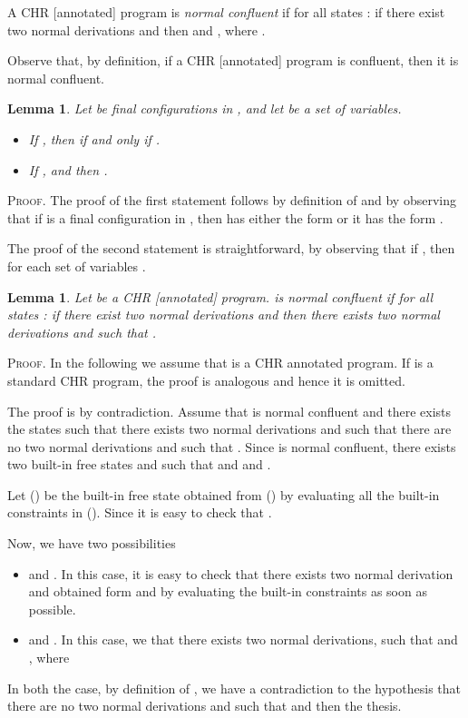 \documentclass[final]{acmtrans2e}
\newtheorem{lemma}[theorem]{Lemma}
\begin{document}
\begin{definition}
A CHR [annotated] program is \emph{normal confluent} if for all states
:
if there exist two normal derivations  and  then  and , where .
\end{definition}


Observe that, by definition, if a CHR [annotated] program is confluent, then it is normal confluent.


\begin{lemma}\label{relrel}
Let  be final configurations in ,  and let  be a set of variables.
\begin{itemize}
  \item If ,  then   if and only if .
  \item If ,  and   then .
\end{itemize}
\end{lemma}
\textsc{Proof.}
The proof of the first statement follows by definition of  and by observing that if  is a final configuration in , then 
has either the form   or it
has the form .

The proof of the second statement is straightforward, by observing that if , then
 for each set of variables .




\begin{lemma}\label{conflnorm}
Let  be a CHR [annotated] program.  is normal confluent if for all states
:
if there exist two normal derivations  and  then there exists two normal derivations  and  such that .
\end{lemma}
\textsc{Proof.}
 In the following we assume that  is a CHR annotated program.
If  is a standard CHR program, the proof is analogous and hence it is omitted.


The proof is by contradiction.
Assume that  is normal confluent and there exists the states
 such that there exists  two normal derivations  and  such that there are no two normal derivations  and  such that
.
Since  is normal confluent, there exists two built-in free states  and  such that  and  and
.

Let  () be the built-in free state obtained from  () by evaluating all the built-in constraints in  (). Since  it is easy to check that .

Now, we have two possibilities
\begin{itemize}
  \item  and . In this case, it is easy to check that there exists two normal derivation  and  obtained form  and  by evaluating the built-in constraints as soon as possible.
  \item  and . In this case, we that there exists two normal derivations, such that  and
      ,
      where
      
 \end{itemize}
In both the case, by definition of , we have a contradiction to the hypothesis that there are no two normal derivations  and  such that
 and then the thesis.
\end{document}
